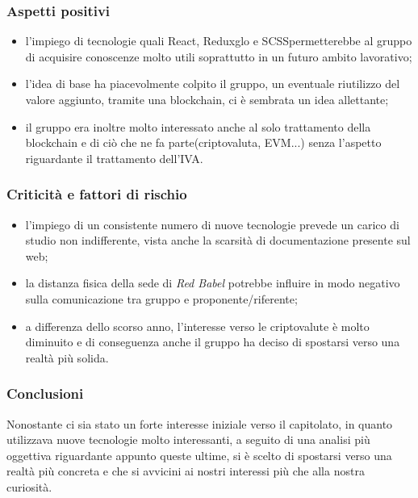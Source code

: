 \subsubsection{Aspetti positivi} 
\begin{itemize}
	\item l'impiego di tecnologie quali React\glo, Reduxglo e SCSS\glosp permetterebbe al gruppo di acquisire conoscenze molto utili soprattutto in un futuro ambito lavorativo;	
	\item l'idea di base ha piacevolmente colpito il gruppo, un eventuale riutilizzo del valore aggiunto, tramite una blockchain\glo, ci è sembrata un idea allettante;	
	\item il gruppo era inoltre molto interessato anche al solo trattamento della blockchain e di ciò che ne fa parte(criptovaluta, EVM\glo...) senza l'aspetto riguardante il trattamento dell'IVA.
\end{itemize}

\subsubsection{Criticità e fattori di rischio}
\begin{itemize}
	\item l'impiego di un consistente numero di nuove tecnologie prevede un carico di studio non indifferente, vista anche la scarsità di documentazione presente sul web;	
	\item la distanza fisica della sede di \textit{Red Babel} potrebbe influire in modo negativo sulla comunicazione tra gruppo e proponente/riferente; 	
	\item a differenza dello scorso anno, l'interesse verso le criptovalute è molto diminuito e di conseguenza anche il gruppo ha deciso di spostarsi verso una realtà più solida.  
\end{itemize}

\subsubsection{Conclusioni}
Nonostante ci sia stato un forte interesse iniziale verso il capitolato\glo, in quanto utilizzava nuove tecnologie molto interessanti, a seguito di una analisi più oggettiva riguardante appunto queste ultime, si è scelto di spostarsi verso una realtà più concreta e che si avvicini ai nostri interessi più che alla nostra curiosità.